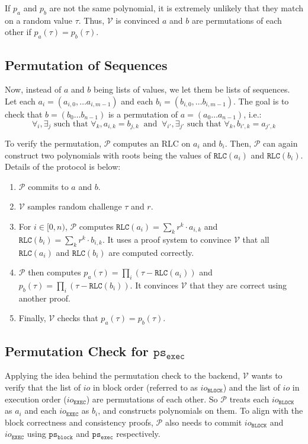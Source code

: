 \documentclass{article}
\renewcommand{\P}{\mathcal{P}}
\newcommand{\V}{\mathcal{V}}
\newcommand{\RLC}{\mathtt{RLC}}
\newcommand{\iob}{io_{\mathtt{BLOCK}}}
\newcommand{\ioe}{io_{\mathtt{EXEC}}}
\newcommand{\psb}{\mathtt{ps_{block}}}
\newcommand{\pse}{\mathtt{ps_{exec}}}
\begin{document}
If $p_a$ and $p_b$ are not the same polynomial, it is extremely unlikely that they match on a random value $\tau$. Thus, $\V$ is convinced $a$ and $b$ are permutations of each other if $p_a(\tau) = p_b(\tau)$.

\subsection{Permutation of Sequences}

Now, instead of $a$ and $b$ being lists of values, we let them be lists of sequences. Let each $a_i = (a_{i, 0}, \dots a_{i, m-1})$ and each $b_i = (b_{i, 0}, \dots b_{i, m-1})$. The goal is to check that $b = (b_0\dots b_{n-1})$ is a permutation of $a = (a_0\dots a_{n-1})$, i.e.:
$$\forall_i, \exists_j \mbox{ such that } \forall_k, a_{i, k} = b_{j, k} \ \mbox{ and }\ \forall_{i'}, \exists_{j'} \mbox{ such that } \forall_k, b_{i', k} = a_{j', k}$$

To verify the permutation, $\P$ computes an RLC on $a_i$ and $b_i$. Then, $\P$ can again construct two polynomials with roots being the values of $\RLC(a_i)$ and $\RLC(b_i)$. Details of the protocol is below:
\begin{enumerate}
    \item $\P$ commits to $a$ and $b$.
    \item $\V$ samples random challenge $\tau$ and $r$.
    \item For $i\in [0, n)$, $\P$ computes $\RLC(a_i) = \sum_k r^k \cdot a_{i, k}$ and $\RLC(b_i) = \sum_k r^k \cdot b_{i, k}$. It uses a proof system to convince $\V$ that all $\RLC(a_i)$ and $\RLC(b_i)$ are computed correctly.
    \item $\P$ then computes $p_a(\tau) = \prod_i (\tau - \RLC(a_i))$ and $p_b(\tau) = \prod_i (\tau - \RLC(b_i))$. It convinces $\V$ that they are correct using another proof.
    \item Finally, $\V$ checks that $p_a(\tau) = p_b(\tau)$.
\end{enumerate} 

\subsection{Permutation Check for $\pse$}

Applying the idea behind the permutation check to the backend, $\V$ wants to verify that the list of $io$ in block order (referred to as $\iob$) and the list of $io$ in execution order ($\ioe$) are permutations of each other. So $\P$ treats each $\iob$ as $a_i$ and each $\ioe$ as $b_i$, and constructs polynomials on them. To align with the block correctness and consistency proofs, $\P$ also needs to commit $\iob$ and $\ioe$ using $\psb$ and $\pse$ respectively.
\end{document}

